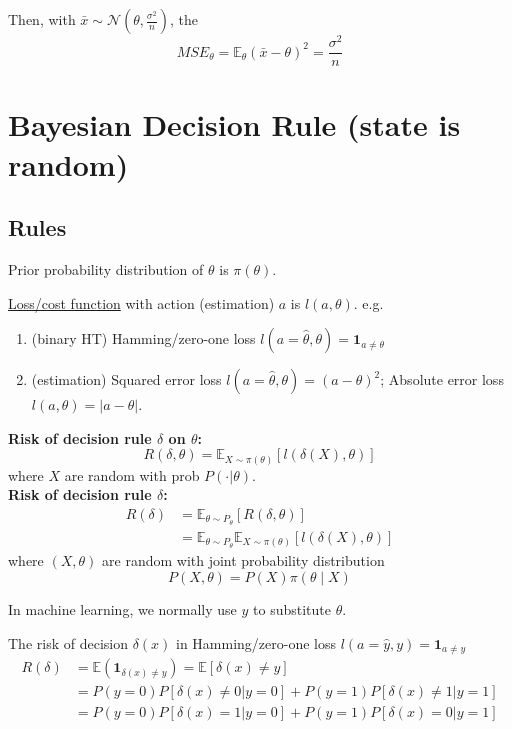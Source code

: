 \documentclass[11pt]{elegantbook}
\begin{document}
Then, with $\bar{x}\sim \mathcal{N}(\theta,\frac{\sigma^2}{n})$, the $$MSE_\theta=\mathbb{E}_\theta\left(\bar{x}-\theta\right)^2=\frac{\sigma^2}{n}$$

\section{Bayesian Decision Rule (state is random)}
\subsection{Rules}
Prior probability distribution of $\theta$ is $\pi(\theta)$.

\underline{Loss/cost function} with action (estimation) $a$ is $l(a,\theta)$. e.g.
\begin{enumerate}
    \item (binary HT) Hamming/zero-one loss $l(a=\hat{\theta},\theta)=\mathbf{1}_{a\neq \theta}$
    \item (estimation) Squared error loss $l(a=\hat{\theta},\theta)=(a-\theta)^2$; Absolute error loss $l(a,\theta)=|a-\theta|$.
\end{enumerate}

\begin{definition}[Risk]
    \normalfont
    \textbf{Risk of decision rule $\delta$ on $\theta$:} $$R(\delta,\theta)=\mathbb{E}_{X\sim \pi(\theta)}\left[l(\delta(X),\theta)\right]$$ where $X$ are random with prob $P(\cdot|\theta)$.\\
    \textbf{Risk of decision rule $\delta$:}
        \begin{equation}
            \begin{aligned}
                R(\delta)&=\mathbb{E}_{\theta\sim P_\theta}[R(\delta,\theta)]\\
                &=\mathbb{E}_{\theta\sim P_\theta}\mathbb{E}_{X\sim \pi(\theta)}\left[l(\delta(X),\theta)\right]
            \end{aligned}
            \nonumber
        \end{equation}
        where $(X,\theta)$ are random with joint probability distribution $$P(X,\theta)=P(X)\pi(\theta\mid X)$$
\end{definition}
\begin{note}
    In machine learning, we normally use $y$ to substitute $\theta$.
\end{note}


\begin{example}
    The risk of decision $\delta(x)$ in Hamming/zero-one loss $l(a=\hat{y},y)=\mathbf{1}_{a\neq y}$
    \begin{equation}
        \begin{aligned}
            R(\delta)&=\mathbb{E}(\mathbf{1}_{\delta(x)\neq y})=\mathbb{E}[\delta(x)\neq y]\\
            &=P(y=0)P[\delta(x)\neq 0|y=0]+P(y=1)P[\delta(x)\neq 1|y=1]\\
            &=P(y=0)P[\delta(x)=1|y=0]+P(y=1)P[\delta(x)=0|y=1]
        \end{aligned}
        \nonumber
    \end{equation}
\end{example}
\end{document}
